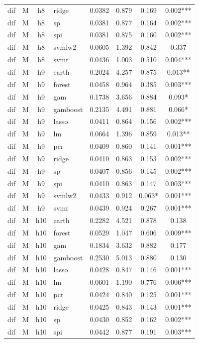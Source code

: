 \begin{ThreePartTable}
\begin{longtable}[t]{llclcccc}
dif & M & h8 & ridge & 0.0382 & 0.879 & 0.169 & 0.002***\\
dif & M & h8 & sp & 0.0381 & 0.877 & 0.164 & 0.002***\\
dif & M & h8 & spi & 0.0381 & 0.875 & 0.160 & 0.002***\\
dif & M & h8 & svmlw2 & 0.0605 & 1.392 & 0.842 & 0.337\\
dif & M & h8 & svmr & 0.0436 & 1.003 & 0.510 & 0.004***\\
\addlinespace
dif & M & h9 & earth & 0.2024 & 4.257 & 0.875 & 0.013**\\
dif & M & h9 & forest & 0.0458 & 0.964 & 0.385 & 0.003***\\
dif & M & h9 & gam & 0.1738 & 3.656 & 0.884 & 0.093*\\
dif & M & h9 & gamboost & 0.2135 & 4.491 & 0.881 & 0.066*\\
dif & M & h9 & lasso & 0.0411 & 0.864 & 0.156 & 0.002***\\
dif & M & h9 & lm & 0.0664 & 1.396 & 0.859 & 0.013**\\
dif & M & h9 & pcr & 0.0409 & 0.860 & 0.141 & 0.001***\\
dif & M & h9 & ridge & 0.0410 & 0.863 & 0.153 & 0.002***\\
dif & M & h9 & sp & 0.0407 & 0.856 & 0.145 & 0.002***\\
dif & M & h9 & spi & 0.0410 & 0.863 & 0.147 & 0.003***\\
dif & M & h9 & svmlw2 & 0.0433 & 0.912 & 0.063* & 0.001***\\
dif & M & h9 & svmr & 0.0439 & 0.924 & 0.267 & 0.001***\\
\addlinespace
dif & M & h10 & earth & 0.2282 & 4.521 & 0.878 & 0.138\\
dif & M & h10 & forest & 0.0529 & 1.047 & 0.606 & 0.009***\\
dif & M & h10 & gam & 0.1834 & 3.632 & 0.882 & 0.177\\
dif & M & h10 & gamboost & 0.2530 & 5.013 & 0.880 & 0.130\\
dif & M & h10 & lasso & 0.0428 & 0.847 & 0.146 & 0.001***\\
dif & M & h10 & lm & 0.0601 & 1.190 & 0.776 & 0.006***\\
dif & M & h10 & pcr & 0.0424 & 0.840 & 0.125 & 0.001***\\
dif & M & h10 & ridge & 0.0425 & 0.843 & 0.143 & 0.001***\\
dif & M & h10 & sp & 0.0430 & 0.852 & 0.162 & 0.002***\\
dif & M & h10 & spi & 0.0442 & 0.877 & 0.191 & 0.003***\\

\end{longtable}
\end{ThreePartTable}
